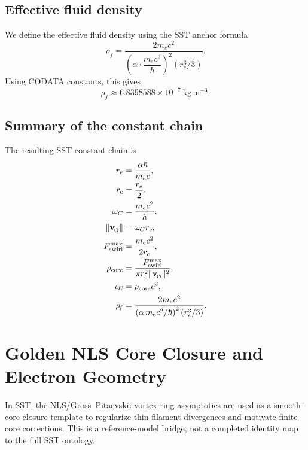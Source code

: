 \documentclass[11pt]{article}
\newcommand{\vswirl}{\mathbf{v}_{\mkern-2mu\scriptscriptstyle\boldsymbol{\circlearrowleft}}}
\newcommand{\rc}{r_c}                                    %
\begin{document}
    \subsection{Effective fluid density}
    We define the effective fluid density using the SST anchor formula
    \begin{equation}
        \boxed{
            \rho_{\!f}
            =
            \frac{2 m_e c^2}{
                \left(\alpha\cdot \dfrac{m_e c^2}{\hbar}\right)^2
                \left(r_e^3/3\right)}
        }.
        \label{eq:rhoF-anchor}
    \end{equation}
    Using CODATA constants, this gives
    \[
        \boxed{
            \rho_{\!f} \approx 6.8398588\times 10^{-7}\ \mathrm{kg\,m^{-3}}
        }.
    \]
    
    \subsection{Summary of the constant chain}
    The resulting SST constant chain is
    \begin{align}
        r_e &= \frac{\alpha\hbar}{m_e c}, \\
        \rc &= \frac{r_e}{2}, \\
        \omega_C &= \frac{m_e c^2}{\hbar}, \\
        \lVert\vswirl\rVert &= \omega_C \rc, \\
        F_{\text{swirl}}^{\max} &= \frac{m_e c^2}{2\rc}, \\
        \rho_{\text{core}} &= \frac{F_{\text{swirl}}^{\max}}{\pi \rc^2 \lVert\vswirl\rVert^2}, \\
        \rho_{\!E} &= \rho_{\text{core}}c^2, \\
        \rho_{\!f} &= \frac{2 m_e c^2}{\left(\alpha \, m_e c^2/\hbar\right)^2 (r_e^3/3)}.
    \end{align}

    \section{Golden NLS Core Closure and Electron Geometry}
    \label{sec:nls_core}
    
    In SST, the NLS/Gross--Pitaevskii vortex-ring asymptotics are used as a smooth-core closure template to regularize thin-filament divergences and motivate finite-core corrections. This is a reference-model bridge, not a completed identity map to the full SST ontology.
    
\end{document}
